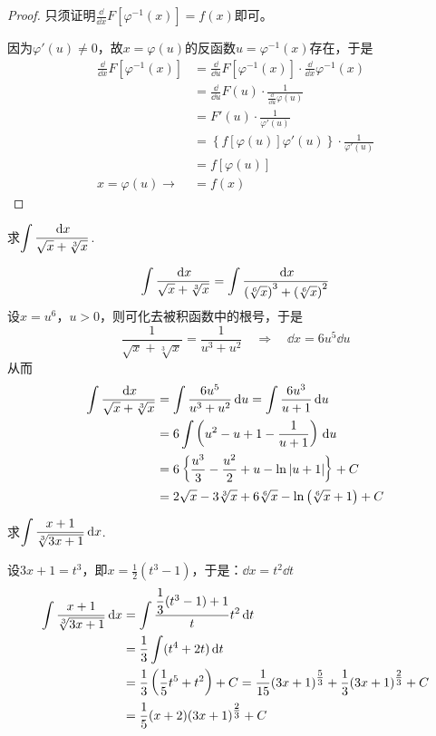 \begin{proof}
只须证明$\frac{\dd}{\dd x}F[\varphi^{-1}(x)]=f(x)$即可。

因为$\varphi'(u)\ne 0$，故$x=\varphi(u)$的反函数$u=\varphi^{-1}(x)$存在，于是
\[\begin{split}
    \frac{\dd}{\dd x}F[\varphi^{-1}(x)]&=\frac{\dd}{\dd u}F[\varphi^{-1}(x)]\cdot \frac{\dd }{\dd x}\varphi^{-1}(x)\\
    &=\frac{\dd}{\dd u}F(u)\cdot \frac{1}{\frac{\dd}{\dd u}\varphi(u)}\\
    &=F'(u)\cdot \frac{1}{\varphi'(u)}\\
    &=\left\{f[\varphi(u)]\varphi'(u)\right\}\cdot \frac{1}{\varphi'(u)}\\
    &=f[\varphi(u)]\\
    x=\varphi(u)\to &=f(x)
\end{split}\]
\end{proof}


\begin{example}
    求$\displaystyle\int\dfrac{\,{\rm d} x}{\sqrt{x}+\sqrt[3]{x}}$.
\end{example}

\begin{solution}
    \[\displaystyle\int\dfrac{\,{\rm d} x}{\sqrt{x}+\sqrt[3]{x}}=\int \dfrac{\,{\rm d} x}{\left(\sqrt[6]{x}\right)^3+\left(\sqrt[6]{x}\right)^2}\]
设$x=u^6$，$u>0$，则可化去被积函数中的根号，于是
\[\frac{1}{\sqrt{x}+\sqrt[3]{x}}=\frac{1}{u^3+u^2}\quad \Rightarrow\quad \dd x=6u^5\dd u\]
从而
\[\begin{split}
    \displaystyle\int\dfrac{\,{\rm d} x}{\sqrt{x}+\sqrt[3]{x}}&=\int \dfrac{6u^5}{u^3+u^2}\,{\rm d} u=\int\dfrac{6u^3}{u+1}\,{\rm d} u\\
    &=6\int \left(u^2-u+1-\dfrac{1}{u+1}\right)\,{\rm d} u\\
    &=6\left\{\dfrac{u^3}{3}-\dfrac{u^2}{2}+u-\ln|u+1|\right\}+C\\
    &=2\sqrt{x}-3\sqrt[3]{x}+6\sqrt[6]{x}-\ln\left(\sqrt[6]{x}+1\right)+C
\end{split}
    \]
\end{solution}

\begin{example}
    求$\displaystyle\int \dfrac{x+1}{\sqrt[3]{3x+1}}\,{\rm d} x$.
\end{example}

\begin{solution}
    设$3x+1=t^3$，即$x=\frac{1}{2}(t^3-1)$，于是：$\dd x=t^2\dd t$
\[\begin{split}
    \displaystyle\int \dfrac{x+1}{\sqrt[3]{3x+1}}\,{\rm d} x&=\int \dfrac{\dfrac{1}{3}(t^3-1)+1}{t}t^2\,{\rm d} t\\
&=\dfrac{1}{3}\int (t^4+2t)\,{\rm d} t\\
&=\dfrac{1}{3}\left(\dfrac{1}{5}t^5+t^2\right)+C=\dfrac{1}{15}(3x+1)^{\tfrac{5}{3}}+\dfrac{1}{3}(3x+1)^{\tfrac{2}{3}}+C\\
&=\dfrac{1}{5}(x+2)(3x+1)^{\tfrac{2}{3}}+C
\end{split}\]
\end{solution}

